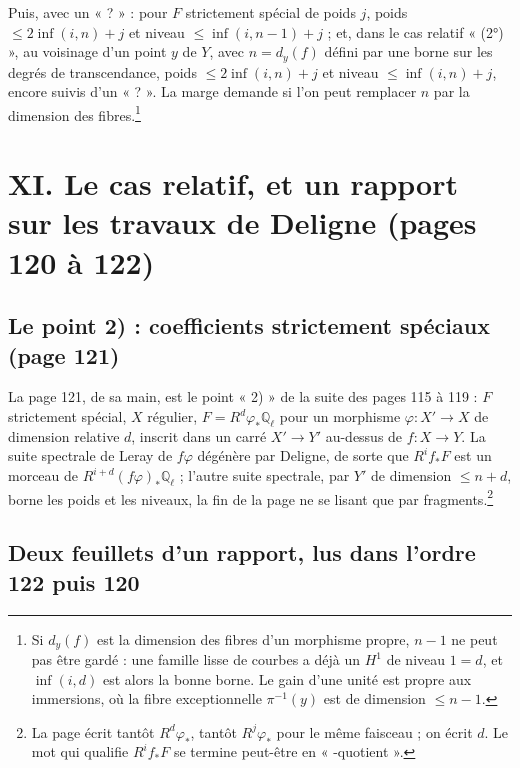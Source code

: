 \documentclass[11pt,a4paper]{article}
\begin{document}
Puis, avec un « ? » : pour $F$ strictement spécial de poids $j$, poids $\leqslant
2\inf(i,n) + j$ et niveau $\leqslant \inf(i, n-1) + j$ ; et, dans le cas relatif
« (2°) », au voisinage d'un point $y$ de $Y$, avec $n = d_{y}(f)$ défini par une
borne sur les degrés de transcendance, poids $\leqslant 2\inf(i, n) + j$ et niveau
$\leqslant \inf(i, n) + j$, encore suivis d'un « ? ». La marge demande si l'on peut
remplacer $n$ par la dimension des fibres.\footnote{Si $d_{y}(f)$ est la dimension des fibres d'un morphisme propre, $n-1$ ne peut pas être gardé : une famille lisse de courbes a déjà un $H^{1}$ de niveau $1 = d$, et $\inf(i, d)$ est alors la bonne borne. Le gain d'une unité est propre aux immersions, où la fibre exceptionnelle $\pi^{-1}(y)$ est de dimension $\leqslant n-1$.}

\section*{XI. Le cas relatif, et un rapport sur les travaux de Deligne (pages 120 à 122)}

\subsection*{Le point 2) : coefficients strictement spéciaux (page 121)}

La page 121, de sa main, est le point « 2) » de la suite des pages 115 à 119 :
$F$ strictement spécial, $X$ régulier, $F = R^{d}\varphi_{*}\mathbb{Q}_{\ell}$ pour un
morphisme $\varphi \colon X' \to X$ de dimension relative $d$, inscrit dans un carré
$X' \to Y'$ au-dessus de $f \colon X \to Y$. La suite spectrale de Leray de
$f\varphi$ dégénère par Deligne, de sorte que $R^{i}f_{*}F$ est un morceau de
$R^{i+d}(f\varphi)_{*}\mathbb{Q}_{\ell}$ ; l'autre suite spectrale, par $Y'$ de
dimension $\leqslant n + d$, borne les poids et les niveaux, la fin de la page ne se
lisant que par fragments.\footnote{La page écrit tantôt $R^{d}\varphi_{*}$, tantôt
$R^{j}\varphi_{*}$ pour le même faisceau ; on écrit $d$. Le mot qui qualifie
$R^{i}f_{*}F$ se termine peut-être en « -quotient ».}

\subsection*{Deux feuillets d'un rapport, lus dans l'ordre 122 puis 120}
\end{document}
